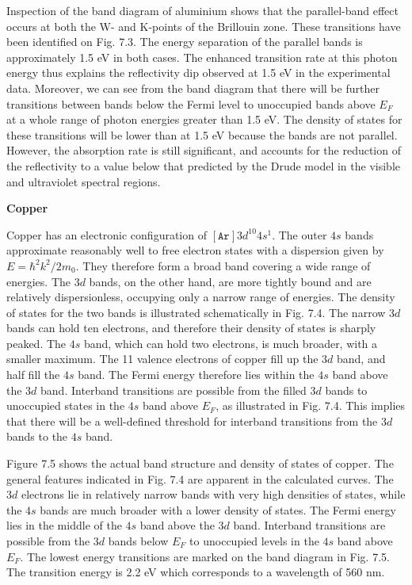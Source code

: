 \documentclass[12pt]{book}
\begin{document}
Inspection of the band diagram of aluminium shows that the parallel-band effect occurs at both the W- and K-points of the Brillouin zone. These transitions have been identified on Fig. 7.3. The energy separation of the parallel bands is approximately 1.5 eV in both cases. The enhanced transition rate at this photon energy thus explains the reflectivity dip observed at 1.5 eV in the experimental data. Moreover, we can see from the band diagram that there will be further transitions between bands below the Fermi level to unoccupied bands above $E_F$ at a whole range of photon energies greater than 1.5 eV. The density of states for these transitions will be lower than at 1.5 eV because the bands are not parallel. However, the absorption rate is still significant, and accounts for the reduction of the reflectivity to a value below that predicted by the Drude model in the visible and ultraviolet spectral regions.

\textbf{Copper}

Copper has an electronic configuration of $[\mathtt{Ar}]3d^{10}4s^1$. The outer $4s$ bands approximate reasonably well to free electron states with a dispersion given by $E = \hbar^2k^2 /2m_0$. They therefore form a broad band covering a wide range of energies. The $3d$ bands, on the other hand, are more tightly bound and are relatively dispersionless, occupying only a narrow range of energies. The density of states for the two bands is illustrated schematically in Fig. 7.4. The narrow $3d$ bands can hold ten electrons, and therefore their density of states is sharply peaked. The $4s$ band, which can hold two electrons, is much broader, with a smaller maximum. The 11 valence electrons of copper fill up the $3d$ band, and half fill the $4s$ band. The Fermi energy therefore lies within the $4s$ band above the $3d$ band. Interband transitions are possible from the filled $3d$ bands to unoccupied states in the $4s$ band above $E_F$, as illustrated in Fig. 7.4. This implies that there will be a well-defined threshold for interband transitions from the $3d$ bands to the $4s$ band.

Figure 7.5 shows the actual band structure and density of states of copper. The general features indicated in Fig. 7.4 are apparent in the calculated curves. The $3d$ electrons lie in relatively narrow bands with very high densities of states, while the $4s$ bands are much broader with a lower density of states. The Fermi energy lies in the middle of the $4s$ band above the $3d$ band. Interband transitions are possible from the $3d$ bands below $E_F$ to unoccupied levels in the $4s$ band above $E_F$. The lowest energy transitions are marked on the band diagram in Fig. 7.5. The transition energy is 2.2 eV which corresponds to a wavelength of 560 nm.
\end{document}
